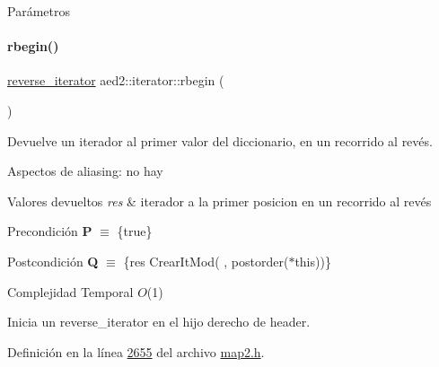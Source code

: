 \begin{DoxyParams}{\-Parámetros}
\begin{DoxyCompactItemize}
\mbox{\label{classaed2_1_1iterator_a296638725dce2fc10316d18563eb3131_a296638725dce2fc10316d18563eb3131}} 
\paragraph{\texorpdfstring{rbegin()}{rbegin()}\hspace{0.1cm}{\footnotesize\ttfamily [1/2]}}
{\footnotesize\ttfamily \hyperlink{classaed2_1_1iterator_a07b2c0fa31611e03cd019b290acd6d80_a07b2c0fa31611e03cd019b290acd6d80}{reverse\+\_\+iterator} aed2\+::iterator\+::rbegin (\begin{DoxyParamCaption}{ }\end{DoxyParamCaption})\hspace{0.3cm}{\ttfamily [inline]}}



Devuelve un iterador al primer valor del diccionario, en un recorrido al revés. 

\begin{DoxyParagraph}{Aspectos de aliasing\+:}
no hay
\end{DoxyParagraph}

\begin{DoxyRetVals}{Valores devueltos}
{\em res} & iterador a la primer posicion en un recorrido al revés\\
\hline
\end{DoxyRetVals}
\begin{DoxyPrecond}{Precondición}
{\bfseries P} $\equiv$ \{true\} 
\end{DoxyPrecond}
\begin{DoxyPostcond}{Postcondición}
{\bfseries Q} $\equiv$ \{res  Crear\+It\+Mod(  , postorder($\ast$this))\}
\end{DoxyPostcond}

\begin{DoxyDescription}
\item[Complejidad Temporal]$O$(1)
\end{DoxyDescription}

Inicia un reverse\+\_\+iterator en el hijo derecho de header. 

Definición en la línea \hyperlink{map2_8h_source_l02655}{2655} del archivo \hyperlink{map2_8h_source}{map2.\+h}.

\mbox{\label{classaed2_1_1iterator_a633182fba99ef1a9f10f7bb836f990e0_a633182fba99ef1a9f10f7bb836f990e0}} 

\end{DoxyCompactItemize}
\end{DoxyParams}
